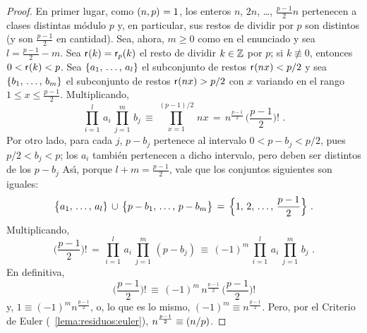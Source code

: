 \begin{proof}
	En primer lugar, como $\mcd{n,p}=1$, los enteros
	$n$, $2n$, \dots, $\tfrac{p-1} 2n$ pertenecen a clases distintas
	m\'odulo $p$ y, en particular, sus restos de dividir por $p$ son
	distintos (y son $\frac{p-1} 2$ en cantidad).
	Sea, ahora, $m\geq 0$ como en el enunciado y sea $l=\frac{p-1} 2-m$.
	Sea $\resto(k)=\resto[p](k)$ el resto de dividir $k\in\Enteros$ por
	$p$; si $k\not\equiv 0$, entonces $0<\resto(k)<p$.
	Sea $\{\lista a{l}\}$ el subconjunto de restos $\resto(nx)<p/2$ y
	sea $\{\lista b{m}\}$ el subconjunto de restos $\resto(nx)>p/2$
	con $x$ variando en el rango $1\leq x\leq\frac{p-1} 2$.
	Multiplicando,
	\begin{displaymath}
		\prod_{i=1}^l\,a_i\,\prod_{j=1}^m\,b_j\,\equiv\,
			\prod_{x=1}^{(p-1)/2}\,nx\,=\,
			n^{\frac{p-1} 2}\,\Big(\frac{p-1} 2\Big)!
		\text{ .}
	\end{displaymath}
	Por otro lado, para cada $j$, $p-b_j$ pertenece al intervalo
	$0<p-b_j<p/2$, pues $p/2<b_j<p$; los $a_i$ tambi\'en pertenecen a
	dicho intervalo, pero deben ser distintos de los $p-b_j$
	\quedacomoejercicio%
	As\'{\i}, porque $l+m=\frac{p-1} 2$, vale que los conjuntos siguientes
	son iguales:
	\begin{displaymath}
		\big\{\lista a l\}\,\cup\,\big\{p-b_1,\,\dots,\,p-b_m\big\}
		\,=\,\Big\{1,\,2,\,\dots,\,\frac{p-1} 2\Big\}
		\text{ .}
	\end{displaymath}
	Multiplicando,
	\begin{displaymath}
		\Big(\frac{p-1} 2\Big)!\,=\,
			\prod_{i=1}^l\,a_i\,\prod_{j=1}^m\,(p-b_j)\,\equiv\,
			(-1)^m\,\prod_{i=1}^l\,a_i\,\prod_{j=1}^m\,b_j
		\text{ .}
	\end{displaymath}
	En definitiva,
	\begin{displaymath}
		\Big(\frac{p-1} 2\Big)!\,\equiv\,(-1)^m\,n^{\frac{p-1} 2}\,
			\Big(\frac{p-1} 2\Big)!
	\end{displaymath}
	y, $1\equiv(-1)^mn^{\frac{p-1} 2}$, o, lo que es lo mismo,
	$(-1)^m\equiv n^{\frac{p-1} 2}$. Pero, por el Criterio de Euler
	(\lemaname~\ref{lema:residuos:euler}),
	$n^{\frac{p-1} 2}\equiv\tlegendre n p$.
\end{proof}

